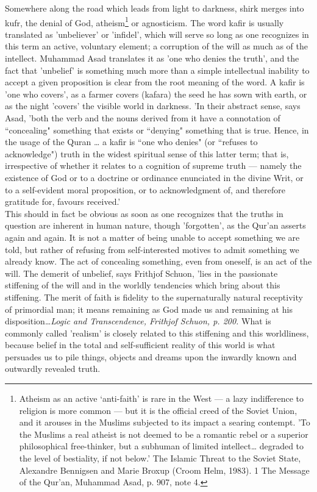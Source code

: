\documentclass[10pt, twoside]{book}
\begin{document}
Somewhere along the road which leads from light to darkness, shirk merges into kufr, the denial of 
God, atheism\footnote{Atheism as an active `anti\hyp{}faith' is rare in the West --- a lazy indifference to religion is more common --- but it is the official creed of the Soviet Union, and it arouses in the Muslims subjected to its impact a searing contempt. 'To the Muslims a real atheist is not deemed to be a romantic rebel or 
a superior philosophical free\hyp{}thinker, but a subhuman of limited intellect\ldots{} degraded to the level 
of bestiality, if not below.' The Islamic Threat to the Soviet State, Alexandre Bennigsen and Marie 
Broxup (Croom Helm, 1983). 1 The Message of the Qur'an, Muhammad Asad, p. 907, note 4.} or agnosticism. The word kafir is usually translated as 'unbeliever' or 'infidel', which will serve so long as one recognizes in this term an active, voluntary element; a corruption of the will as much as of the intellect. Muhammad Asad translates it as 'one who denies the truth', and the fact that 'unbelief' is something much more than a simple intellectual inability to accept a given proposition is clear from the root meaning of the word. A kafir is 'one who covers', as a farmer covers (kafara) the seed he has sown with earth, or as the night 'covers' the visible world in darkness. 'In their abstract sense, says Asad, 'both the verb and the nouns derived from it have a connotation of ``concealing" something that exists or ``denying" something that is true. Hence, in the usage of the Quran \ldots{} a kafir is ``one who denies" (or ``refuses to acknowledge") truth in the widest spiritual sense of this latter term; that is, irrespective of whether it relates to a cognition of supreme truth --- namely the existence of God or to a doctrine or ordinance enunciated in the divine Writ, or to a self\hyp{}evident moral proposition, or to acknowledgment of, and therefore gratitude for, favours received.'\\

This should in fact be obvious as soon as one recognizes that the truths in question are inherent in 
human nature, though 'forgotten', as the Qur'an asserts again and again. It is not a matter of being 
unable to accept something we are told, but rather of refusing from self-interested motives to admit 
something we already know. The act of concealing something, even from oneself, is an act of the will. 
The demerit of unbelief, says Frithjof Schuon, 'lies in the passionate stiffening of the will and in 
the worldly tendencies which bring about this stiffening. The merit of faith is fidelity to the 
supernaturally natural receptivity of primordial man; it means remaining as God made us and remaining 
at his disposition\ldots{}\emph{Logic and Transcendence, Frithjof Schuon, p. 200.} What is commonly called 'realism' is closely related to this stiffening and this worldliness, because belief in the total and self\hyp{}sufficient reality of this world is what persuades us to pile things, objects and dreams upon the inwardly known and outwardly revealed truth. \\
\end{document}
